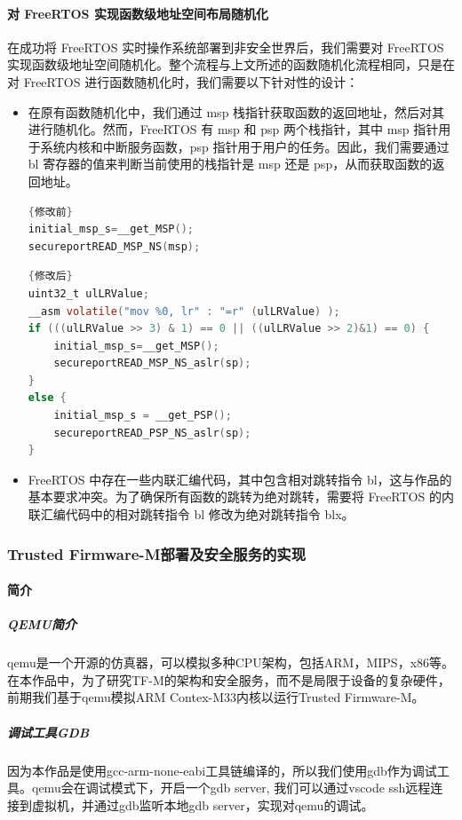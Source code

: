\documentclass[UTF8,12pt,a4paper,twoside]{ctexart}
\numberwithin{figure}{section}
\begin{document}
\paragraph{对 FreeRTOS 实现函数级地址空间布局随机化}
\par 在成功将 FreeRTOS 实时操作系统部署到非安全世界后，我们需要对 FreeRTOS 实现函数级地址空间随机化。整个流程与上文所述的函数随机化流程相同，只是在对 FreeRTOS 进行函数随机化时，我们需要以下针对性的设计：
\begin{itemize}
    \item 在原有函数随机化中，我们通过 msp 栈指针获取函数的返回地址，然后对其进行随机化。然而，FreeRTOS 有 msp 和 psp 两个栈指针，其中 msp 指针用于系统内核和中断服务函数，psp 指针用于用户的任务。因此，我们需要通过 bl 寄存器的值来判断当前使用的栈指针是 msp 还是 psp，从而获取函数的返回地址。
          \begin{lstlisting}[language=C]{修改前}
initial_msp_s=__get_MSP();
secureportREAD_MSP_NS(msp); \end{lstlisting}
          \begin{lstlisting}[language=C]{修改后}
uint32_t ulLRValue;
__asm volatile("mov %0, lr" : "=r" (ulLRValue) );
if (((ulLRValue >> 3) & 1) == 0 || ((ulLRValue >> 2)&1) == 0) {
    initial_msp_s=__get_MSP();
    secureportREAD_MSP_NS_aslr(sp);
}
else {
    initial_msp_s = __get_PSP();
    secureportREAD_PSP_NS_aslr(sp);
} \end{lstlisting}
    \item FreeRTOS 中存在一些内联汇编代码，其中包含相对跳转指令 bl，这与作品的基本要求冲突。为了确保所有函数的跳转为绝对跳转，需要将 FreeRTOS 的内联汇编代码中的相对跳转指令 bl 修改为绝对跳转指令 blx。
\end{itemize}

\subsubsection{Trusted Firmware-M部署及安全服务的实现}
\paragraph{简介}
\subparagraph{QEMU简介}
\par qemu是一个开源的仿真器，可以模拟多种CPU架构，包括ARM，MIPS，x86等。在本作品中，为了研究TF-M的架构和安全服务，而不是局限于设备的复杂硬件，前期我们基于qemu模拟ARM Contex-M33内核以运行Trusted Firmware-M。
\subparagraph{调试工具GDB}
因为本作品是使用gcc-arm-none-eabi工具链编译的，所以我们使用gdb作为调试工具。qemu会在调试模式下，开启一个gdb server, 我们可以通过vscode ssh远程连接到虚拟机，并通过gdb监听本地gdb server，实现对qemu的调试。
\end{document}
